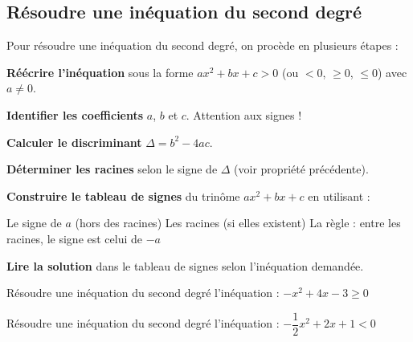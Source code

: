 \subsection{Résoudre une inéquation du second degré}
\begin{Methode}
Pour résoudre une inéquation du second degré, on procède en plusieurs étapes :

\begin{tcbenumerate}
\tcbitem\textbf{Réécrire l'inéquation} sous la forme $ax^2+bx+c>0$ (ou $<0$, $\geq 0$, $\leq 0$) avec $a\neq 0$.

\tcbitem\textbf{Identifier les coefficients} $a$, $b$ et $c$. Attention aux signes !

\tcbitem\textbf{Calculer le discriminant} $\Delta = b^2-4ac$.

\tcbitem\textbf{Déterminer les racines} selon le signe de $\Delta$ (voir propriété précédente).

\tcbitem\textbf{Construire le tableau de signes} du trinôme $ax^2+bx+c$ en utilisant :
\begin{MultiColonnes}{1}
    \tcbitem Le signe de $a$ (hors des racines)
    \tcbitem Les racines (si elles existent)
    \tcbitem La règle : entre les racines, le signe est celui de $-a$
\end{MultiColonnes}

\tcbitem\textbf{Lire la solution} dans le tableau de signes selon l'inéquation demandée.
\end{tcbenumerate}
\end{Methode}

\def\rdifficulty{2}
\begin{EXO}{Résoudre une inéquation du second degré}{}
 l'inéquation : $-x^2+4x-3 \geq 0$
\begin{crep}[colback=white]
\end{crep}

\exocorrection

\end{EXO}

\def\rdifficulty{2}
\begin{EXO}{Résoudre une inéquation du second degré}{}
 l'inéquation : $-\dfrac{1}{2}x^2+2x+1 < 0$

\exocorrection


\end{EXO}